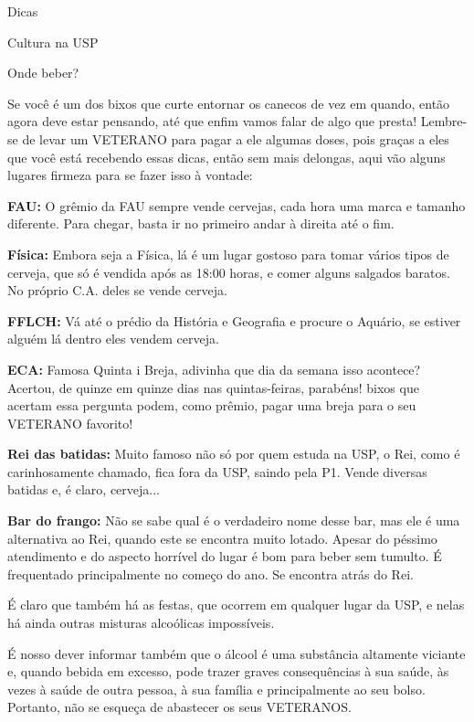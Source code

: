 \begin{secao}{Dicas}
\begin{subsecao}{Cultura na USP}
\end{subsecao}

\begin{subsecao}{Onde beber?}

Se você é um dos bixos que curte entornar os canecos de vez em quando, então agora
deve estar pensando, até que enfim vamos falar de algo que presta! Lembre-se de
levar um VETERANO para pagar a ele algumas doses, pois graças a eles que você
está recebendo essas dicas, então sem mais delongas, aqui vão alguns lugares
firmeza para se fazer isso à vontade:

{\bf FAU:} O grêmio da FAU sempre vende cervejas, cada hora uma marca e tamanho diferente. Para chegar, basta ir no primeiro andar à direita até o fim.

{\bf Física:} Embora seja a Física, lá é um lugar gostoso para tomar vários
tipos de cerveja, que só é vendida após as 18:00 horas, e comer alguns
salgados baratos. No próprio C.A. deles se vende cerveja.

{\bf FFLCH:} Vá até o prédio da História e Geografia e procure o Aquário, se estiver alguém lá dentro eles vendem cerveja.

{\bf ECA:} Famosa Quinta i Breja, adivinha que dia da semana isso acontece?
Acertou, de quinze em quinze dias nas quintas-feiras, parabéns! bixos que
acertam essa pergunta podem, como prêmio, pagar uma breja para o seu VETERANO
favorito!

{\bf Rei das batidas:} Muito famoso não só por quem estuda na USP, o Rei,
como é carinhosamente chamado, fica fora da USP, saindo pela P1. Vende
diversas batidas e, é claro, cerveja...

{\bf Bar do frango:} Não se sabe qual é o verdadeiro nome desse bar, mas ele é
uma alternativa ao Rei, quando este se encontra muito lotado. Apesar do péssimo atendimento e do aspecto horrível do lugar é bom para beber sem
tumulto. É frequentado principalmente no começo do ano. Se encontra atrás do
Rei.

É claro que também há as festas, que ocorrem em qualquer lugar da USP, e nelas
há ainda outras misturas alcoólicas impossíveis.

É nosso dever informar também que o álcool é uma substância altamente viciante
e, quando bebida em excesso, pode trazer graves consequências à sua saúde, às
vezes à saúde de outra pessoa, à sua família e principalmente ao seu bolso.
Portanto, não se esqueça de abastecer os seus VETERANOS.

\end{subsecao}
\end{secao}
